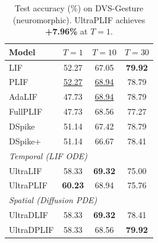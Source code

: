 \documentclass{article}
\theoremstyle{plain}
\theoremstyle{definition}
\theoremstyle{remark}
\begin{document}
\begin{table}[t]
\caption{Test accuracy (\%) on DVS-Gesture (neuromorphic). UltraPLIF achieves \textbf{+7.96\%} at $T{=}1$.}
\label{tab:dvs}
\vskip 0.1in
\begin{center}
\begin{small}
\begin{tabular}{lccc}
\toprule
Model & $T{=}1$ & $T{=}10$ & $T{=}30$ \\
\midrule
LIF        & 52.27 & 67.05 & \textbf{79.92} \\
PLIF       & \underline{52.27} & \underline{68.94} & 78.79 \\
AdaLIF     & 47.73 & \underline{68.94} & 78.79 \\
FullPLIF   & 47.73 & 68.56 & 77.27 \\
DSpike     & 51.14 & 67.42 & 78.79 \\
DSpike+    & 51.14 & 66.67 & 78.41 \\
\midrule
\multicolumn{4}{l}{\textit{Temporal (LIF ODE)}} \\
UltraLIF   & 58.33 & \textbf{69.32} & 75.00 \\
UltraPLIF  & \textbf{60.23} & 68.94 & 75.76 \\
\midrule
\multicolumn{4}{l}{\textit{Spatial (Diffusion PDE)}} \\
UltraDLIF  & 58.33 & \textbf{69.32} & 78.41 \\
UltraDPLIF & 58.33 & 68.56 & \textbf{79.92} \\
\bottomrule
\end{tabular}
\end{small}
\end{center}
\vskip -0.1in
\end{table}
\end{document}
